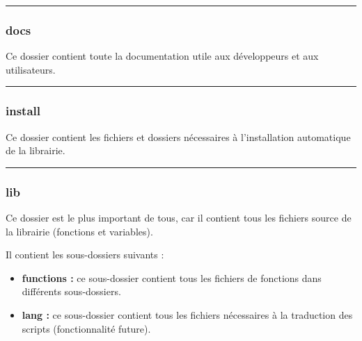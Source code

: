 \documentclass[a4paper,10pt]{article}
\begin{document}

\color{blue}\par\noindent\rule{\textwidth}{0.4pt}\color{white}

\color{blue}
\subsubsection{docs}\color{white}

\begin{justify}
    Ce dossier contient toute la documentation utile aux développeurs et aux utilisateurs.
\end{justify}



\color{blue}\par\noindent\rule{\textwidth}{0.4pt}\color{white}

\color{blue}
\subsubsection{install}\color{white}

\begin{justify}
    Ce dossier contient les fichiers et dossiers nécessaires à l'installation automatique de la librairie.
\end{justify}



\color{blue}\par\noindent\rule{\textwidth}{0.4pt}\color{white}

\color{blue}
\subsubsection{lib}\color{white}

\begin{justify}
    Ce dossier est le plus important de tous, car il contient tous les fichiers source de la librairie (fonctions et variables).
\end{justify}


\begin{justify}
    Il contient les sous-dossiers suivants :

    \begin{itemize}
        \item \color{lime}\textbf{functions\color{white} :} \color{white} ce sous-dossier contient tous les fichiers de fonctions dans différents sous-dossiers.\\

        \item \color{lime}\textbf{lang\color{white} :} \color{white} ce sous-dossier contient tous les fichiers nécessaires à la traduction des scripts (fonctionnalité future).
    \end{itemize}
\end{justify}
\end{document}
